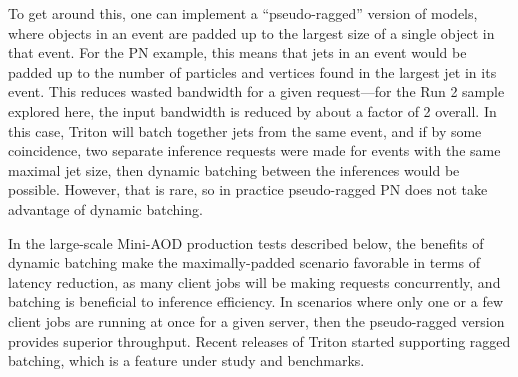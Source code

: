 To get around this, one can implement a ``pseudo-ragged'' version of models, where objects in an event are padded up to the largest size of a single object in that event. For the PN example, this means that jets in an event would be padded up to the number of particles and vertices found in the largest jet in its event. This reduces wasted bandwidth for a given request---for the Run 2 \ttbar sample explored here, the input bandwidth is reduced by about a factor of 2 overall. In this case, Triton will batch together jets from the same event, and if by some coincidence, two separate inference requests were made for events with the same maximal jet size, then dynamic batching between the inferences would be possible. However, that is rare, so in practice pseudo-ragged PN does not take advantage of dynamic batching.

In the large-scale Mini-AOD production tests described below, the benefits of dynamic batching make the maximally-padded scenario favorable in terms of latency reduction, as many client jobs will be making requests concurrently, and batching is beneficial to inference efficiency. In scenarios where only one or a few client jobs are running at once for a given server, then the pseudo-ragged version provides superior throughput. Recent releases of Triton started supporting ragged batching, which is a feature under study and benchmarks.%